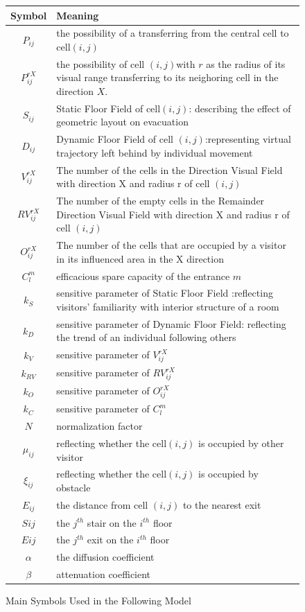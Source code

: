 \documentclass{mcmthesis}
\begin{document}
\begin{figure}[H]
\captionsetup{type=table}
\captionsetup{font=small, labelfont=bf}
\caption{Main Symbols Used in the Following Model}
\begin{tabular}{cp{35em}}

\toprule
Symbol &Meaning \\
\midrule
$P_{ij}$& the possibility of a transferring from the central cell to cell$(i, j) $ \\
\hline
$P_{ij}^{rX}$& the possibility of cell $(i, j)$with $ r$ as the radius of its visual range  transferring to its neighoring cell in the direction $X$.\\
\hline
$S_{ij} $& Static Floor Field of cell$(i, j)$: describing the effect of  geometric layout on evacuation \\
\hline
$D_{ij}$ & Dynamic Floor Field of cell $(i, j)$:representing virtual trajectory left behind by individual movement\\
\hline
$V_{ij}^{rX} $& The number of the cells in the Direction Visual Field with direction X and radius r of cell $(i, j)$
\\
\hline
$RV_{ij}^{rX}$ & The number of the empty cells in the Remainder Direction Visual Field with direction X and radius r of cell $(i, j)$
\\
\hline
$O_{ij}^{rX} $&The number of the cells that are occupied by a visitor in its influenced area in the X direction\\
\hline
$C_l^m$&efficacious spare capacity of the entrance $m$\\
\hline
$k_S$ & sensitive parameter of Static Floor Field :reflecting visitors' familiarity with interior structure of a room\\
\hline
$k_D$ &sensitive parameter of Dynamic Floor Field: reflecting the trend of an individual following others\\
\hline
$k_V$ & sensitive parameter of $V_{ij}^{rX}$
\\
\hline
$k_{RV}$ &sensitive parameter of $RV_{ij}^{rX}$
\\
\hline
$k_{O}$ &sensitive parameter of $O_{ij}^{rX} $
\\
\hline
$k_{C}$ &sensitive parameter of $C_l^m$
\\
\hline
$N$ & normalization factor\\
\hline
$\mu_{ij}$& reflecting whether the cell$(i, j)$ is occupied by other visitor\\
\hline
$\xi_{ij}$&reflecting whether the cell$(i, j) $ is occupied by obstacle\\
\hline 
$E_{ij}$& the distance from cell $(i, j)$ to the nearest exit\\
\hline
$Sij$& the $j^{th}$ stair on the $i^{th}$ floor\\
\hline
$Eij$& the $j^{th}$ exit on the $i^{th}$ floor\\
\hline
$\alpha$&the diffusion coefficient\\
\hline
$\beta$&attenuation coefficient\\
\hline
\bottomrule
\end{tabular}

\end{figure}
\end{document}
